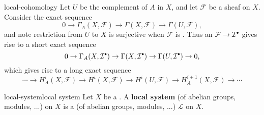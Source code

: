 \begin{example}{local-cohomology}
    Let $U$ be the complement of $A$ in $X$, and let $\mathcal{F}$ be a sheaf on $X$. Consider the exact sequence
    \[ 0 \to \Gamma_A(X, \mathcal{F}) \to \Gamma(X, \mathcal{F}) \to \Gamma(U, \mathcal{F}) , \]
    and note restriction from $U$ to $X$ is surjective when $\mathcal{F}$ is . Thus an  $\mathcal{F} \to \mathcal{I}^\bdot$ gives rise to a short exact sequence
    \[ 0 \to \Gamma_A(X, \mathcal{I}^\bdot) \to \Gamma(X, \mathcal{I}^\bdot) \to \Gamma(U, \mathcal{I}^\bdot) \to 0 , \]
    which gives rise to a long exact sequence
    \[ \cdots \to H_A^i(X, \mathcal{F}) \to H^i(X, \mathcal{F}) \to H^i(U, \mathcal{F}) \to H_A^{i + 1}(X, \mathcal{F}) \to \cdots \]
\end{example}

\begin{topic}{local-system}{local system}
    Let $X$ be a . A \textbf{local system} (of abelian groups, modules, ...) on $X$ is a  (of abelian groups, modules, ...) $\mathcal{L}$ on $X$.
\end{topic}
